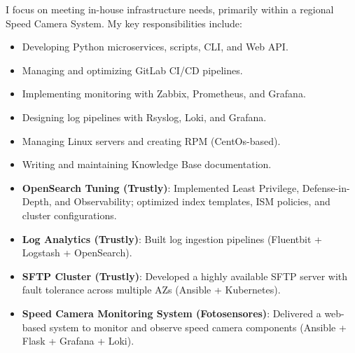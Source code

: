 \documentclass[10pt,a4paper]{altacv}
\begin{document}
\divider


I focus on meeting in-house infrastructure needs, primarily within a regional Speed Camera System. My key responsibilities include:

\bigskip

\begin{itemize}
    \item Developing Python microservices, scripts, CLI, and Web API.
    \item Managing and optimizing GitLab CI/CD pipelines.
    \item Implementing monitoring with Zabbix, Prometheus, and Grafana.
    \item Designing log pipelines with Rsyslog, Loki, and Grafana.
    \item Managing Linux servers and creating RPM (CentOs-based).
    \item Writing and maintaining Knowledge Base documentation.
\end{itemize}


\begin{itemize}
    \item \textbf{OpenSearch Tuning (Trustly)}: Implemented Least Privilege, Defense-in-Depth, and Observability; optimized index templates, ISM policies, and cluster configurations.
    \item \textbf{Log Analytics (Trustly)}: Built log ingestion pipelines (Fluentbit + Logstash + OpenSearch).
    \item \textbf{SFTP Cluster (Trustly)}: Developed a highly available SFTP server with fault tolerance across multiple AZs (Ansible + Kubernetes).
    \item \textbf{Speed Camera Monitoring System (Fotosensores)}: Delivered a web-based system to monitor and observe speed camera components (Ansible + Flask + Grafana + Loki).
\end{itemize}

\clearpage
\end{document}
